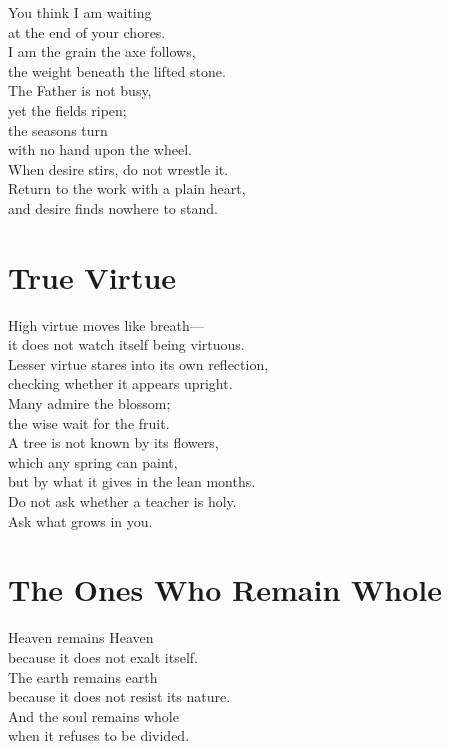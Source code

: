 \documentclass[10pt, openright]{book}
\newcommand{\sectionbreak}{\filbreak}
\newcommand{\sayingsource}[1]{\par\nopagebreak\vspace{0.3\baselineskip}{\raggedleft\footnotesize\itshape #1\par}}
\begin{document}
You think I am waiting\\
at the end of your chores.\\
I am the grain the axe follows,\\
the weight beneath the lifted stone.\\
The Father is not busy,\\
yet the fields ripen;\\
the seasons turn\\
with no hand upon the wheel.\\
When desire stirs, do not wrestle it.\\
Return to the work with a plain heart,\\
and desire finds nowhere to stand.

\sayingsource{Tao Te Ching 37 · Thomas 77}

\sectionbreak

\section{True Virtue}\label{true-virtue}

High virtue moves like breath---\\
it does not watch itself being virtuous.\\
Lesser virtue stares into its own reflection,\\
checking whether it appears upright.\\
Many admire the blossom;\\
the wise wait for the fruit.\\
A tree is not known by its flowers,\\
which any spring can paint,\\
but by what it gives in the lean months.\\
Do not ask whether a teacher is holy.\\
Ask what grows in you.

\sayingsource{Tao Te Ching 38 · Matthew 6:1--4 · Matthew 7:16}

\sectionbreak

\section{The Ones Who Remain Whole}\label{the-ones-who-remain-whole}

Heaven remains Heaven\\
because it does not exalt itself.\\
The earth remains earth\\
because it does not resist its nature.\\
And the soul remains whole\\
when it refuses to be divided.
\end{document}
